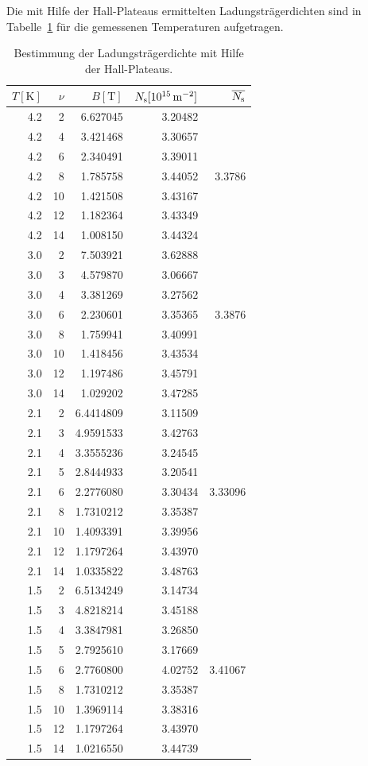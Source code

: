\documentclass[paper=a4,fontsize=10pt,DIV=18,twocolumn,parskip=half]{scrartcl}
\numberwithin{equation}{section}    %
\begin{document}
Die mit Hilfe der Hall-Plateaus ermittelten Ladungsträgerdichten sind in Tabelle~\ref{ladungstraegerdichte2} für die gemessenen Temperaturen aufgetragen.
\begin{table}[htp]
	\begin{center}
	\begin{tabular}{rrrr|r}
		\hline
			$T[\mathrm{K}]$ & $\nu$ & $B[\mathrm{T}]$ & $N_{\rm s}[10^{15}\,\mathrm{m}^{-2}]$ & $\overline{N_{\rm s}}$\\
		\hline
			4.2 &  2 & 6.627045 & 3.20482&\\
			4.2 &  4 & 3.421468 & 3.30657&\\
			4.2 &  6 & 2.340491 & 3.39011&\\
			4.2 &  8 & 1.785758 & 3.44052& 3.3786\\
			4.2 & 10 & 1.421508 & 3.43167&\\
			4.2 & 12 & 1.182364 & 3.43349&\\
			4.2 & 14 & 1.008150 & 3.44324&\\
			\hline
			3.0 &  2 & 7.503921 & 3.62888&\\
			3.0 &  3 & 4.579870 & 3.06667&\\
			3.0 &  4 & 3.381269 & 3.27562&\\
			3.0 &  6 & 2.230601 & 3.35365& 3.3876\\
			3.0 &  8 & 1.759941 & 3.40991&\\
			3.0 & 10 & 1.418456 & 3.43534&\\
			3.0 & 12 & 1.197486 & 3.45791&\\
			3.0 & 14 & 1.029202 & 3.47285&\\
			\hline
			2.1 &  2 & 6.4414809 & 3.11509&\\
			2.1 &  3 & 4.9591533 & 3.42763&\\
			2.1 &  4 & 3.3555236 & 3.24545&\\
			2.1 &  5 & 2.8444933 & 3.20541&\\
			2.1 &  6 & 2.2776080 & 3.30434& 3.33096\\
			2.1 &  8 & 1.7310212 & 3.35387&\\
			2.1 & 10 & 1.4093391 & 3.39956&\\
			2.1 & 12 & 1.1797264 & 3.43970&\\
			2.1 & 14 & 1.0335822 & 3.48763&\\
			\hline
			1.5 &  2 & 6.5134249 & 3.14734&\\
			1.5 &  3 & 4.8218214 & 3.45188&\\
			1.5 &  4 & 3.3847981 & 3.26850&\\
			1.5 &  5 & 2.7925610 & 3.17669&\\
			1.5 &  6 & 2.7760800 & 4.02752& 3.41067\\
			1.5 &  8 & 1.7310212 & 3.35387&\\
			1.5 & 10 & 1.3969114 & 3.38316&\\
			1.5 & 12 & 1.1797264 & 3.43970&\\
			1.5 & 14 & 1.0216550 & 3.44739&\\
		\hline	
	\end{tabular}	
	\caption{Bestimmung der Ladungsträgerdichte mit Hilfe der Hall-Plateaus.}
	\label{ladungstraegerdichte2}
	\end{center}
\end{table}
\end{document}
